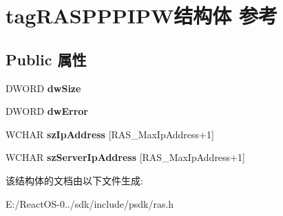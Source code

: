 \hypertarget{structtag_r_a_s_p_p_p_i_p_w}{}\section{tag\+R\+A\+S\+P\+P\+P\+I\+P\+W结构体 参考}
\label{structtag_r_a_s_p_p_p_i_p_w}
\subsection*{Public 属性}
\begin{DoxyCompactItemize}
\item 
\mbox{\label{structtag_r_a_s_p_p_p_i_p_w_a6c062e66892e7af07e0b92c3a8cc04c4}} 
D\+W\+O\+RD {\bfseries dw\+Size}
\item 
\mbox{\label{structtag_r_a_s_p_p_p_i_p_w_a0291c5c213ae941036359c5729986067}} 
D\+W\+O\+RD {\bfseries dw\+Error}
\item 
\mbox{\label{structtag_r_a_s_p_p_p_i_p_w_af02a7615fc3e8f2e93504169b8542501}} 
W\+C\+H\+AR {\bfseries sz\+Ip\+Address} \mbox{[}R\+A\+S\+\_\+\+Max\+Ip\+Address+1\mbox{]}
\item 
\mbox{\label{structtag_r_a_s_p_p_p_i_p_w_a1c2993ef6b59bddb85a04be005af0bc0}} 
W\+C\+H\+AR {\bfseries sz\+Server\+Ip\+Address} \mbox{[}R\+A\+S\+\_\+\+Max\+Ip\+Address+1\mbox{]}
\end{DoxyCompactItemize}


该结构体的文档由以下文件生成\+:\begin{DoxyCompactItemize}
\item 
E\+:/\+React\+O\+S-\/0../sdk/include/psdk/ras.\+h\end{DoxyCompactItemize}
